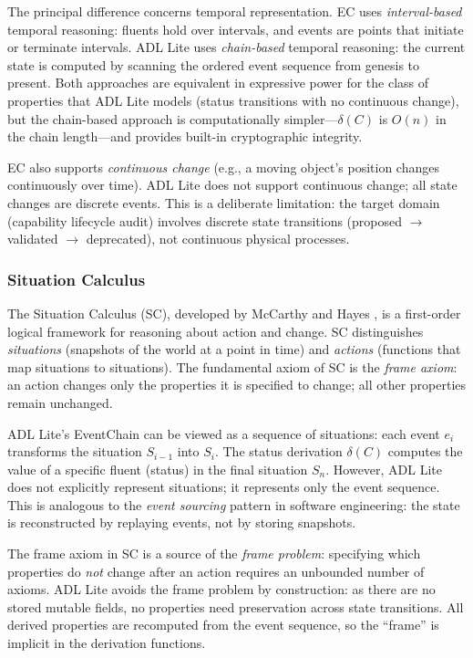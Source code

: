 The principal difference concerns temporal representation. EC uses \emph{interval-based} temporal reasoning: fluents hold over intervals, and events are points that initiate or terminate intervals. ADL Lite uses \emph{chain-based} temporal reasoning: the current state is computed by scanning the ordered event sequence from genesis to present. Both approaches are equivalent in expressive power for the class of properties that ADL Lite models (status transitions with no continuous change), but the chain-based approach is computationally simpler---$\delta(C)$ is $O(n)$ in the chain length---and provides built-in cryptographic integrity.

EC also supports \emph{continuous change} (e.g., a moving object's position changes continuously over time). ADL Lite does not support continuous change; all state changes are discrete events. This is a deliberate limitation: the target domain (capability lifecycle audit) involves discrete state transitions (proposed $\to$ validated $\to$ deprecated), not continuous physical processes.

\subsubsection{Situation Calculus}

The Situation Calculus (SC), developed by McCarthy and Hayes \cite{situation_calculus}, is a first-order logical framework for reasoning about action and change. SC distinguishes \emph{situations} (snapshots of the world at a point in time) and \emph{actions} (functions that map situations to situations). The fundamental axiom of SC is the \emph{frame axiom}: an action changes only the properties it is specified to change; all other properties remain unchanged.

ADL Lite's EventChain can be viewed as a sequence of situations: each event $e_i$ transforms the situation $S_{i-1}$ into $S_i$. The status derivation $\delta(C)$ computes the value of a specific fluent (status) in the final situation $S_n$. However, ADL Lite does not explicitly represent situations; it represents only the event sequence. This is analogous to the \emph{event sourcing} pattern in software engineering: the state is reconstructed by replaying events, not by storing snapshots.

The frame axiom in SC is a source of the \emph{frame problem}: specifying which properties do \emph{not} change after an action requires an unbounded number of axioms. ADL Lite avoids the frame problem by construction: as there are no stored mutable fields, no properties need preservation across state transitions. All derived properties are recomputed from the event sequence, so the ``frame'' is implicit in the derivation functions.

